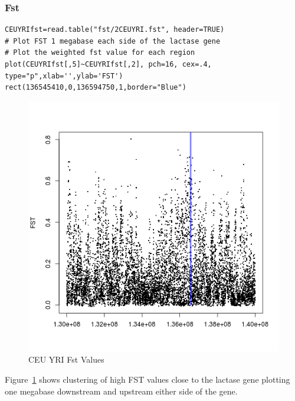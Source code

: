 \subsubsection{Fst}


\begin{verbatim}
CEUYRIfst=read.table("fst/2CEUYRI.fst", header=TRUE)
# Plot FST 1 megabase each side of the lactase gene
# Plot the weighted fst value for each region
plot(CEUYRIfst[,5]~CEUYRIfst[,2], pch=16, cex=.4, type="p",xlab='',ylab='FST') 
rect(136545410,0,136594750,1,border="Blue") 
\end{verbatim}

\begin{figure}
\centering
\includegraphics{pictures/CEUYRI2.png}
\caption{CEU YRI Fst Values}
\label{fig:a}
\end{figure}
Figure~\ref{fig:a} shows clustering of high FST values close to the lactase gene plotting one megabase downstream and upstream either side of the gene. 

